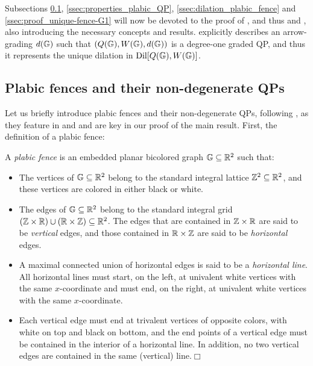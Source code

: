 \noindent Subsections \ref{ssec:QP_plabicfence}, \ref{ssec:properties_plabic_QP}, \ref{ssec:dilation_plabic_fence} and \ref{ssec:proof_unique-fence-G1} will now be devoted to the proof of , and thus  and , also introducing the necessary concepts and results.  explicitly describes an arrow-grading $d(\mathbb G)$ such that $(Q(\mathbb G),W(\mathbb G),d(\mathbb G))$ is a degree-one graded QP, and thus it represents the unique dilation in $\operatorname{Dil}[Q(\mathbb G),W(\mathbb G)]$.

\subsection{Plabic fences and their non-degenerate QPs}\label{ssec:QP_plabicfence} Let us briefly introduce plabic fences and their non-degenerate QPs, following \cite[Section 3]{CasalsGao}, as they feature in  and  and are key in our proof of the main result. First, the definition of a plabic fence:

\begin{definition}\label{def:plabic_fence}
A \emph{plabic fence} is an embedded planar bicolored graph $\mathbb G\subseteq\mathbb R^2$ such that:
\begin{itemize}\setlength\itemsep{0.5em}
    \item[(i)] The vertices of $\mathbb G\subseteq\mathbb R^2$ belong to the standard integral lattice $\mathbb Z^2\subseteq\mathbb R^2$, and these vertices are colored in either black or white.
    \item[(ii)] The edges of $\mathbb G\subseteq\mathbb R^2$ belong to the standard integral grid $(\mathbb Z\times\mathbb R)\cup (\mathbb R\times\mathbb Z)\subseteq\mathbb R^2$. The edges that are contained in $\mathbb Z\times\mathbb R$ are said to be \emph{vertical} edges, and those contained in $\mathbb R\times\mathbb Z$ are said to be \emph{horizontal} edges. 
    \item[(iii)] A maximal connected union of horizontal edges is said to be a \emph{horizontal line}. All horizontal lines must start, on the left, at univalent white vertices with the same $x$-coordinate and must end, on the right, at univalent white vertices with the same $x$-coordinate.
    \item[(iv)] Each vertical edge must end at trivalent vertices of opposite colors, with white on top and black on bottom, and the end points of a vertical edge must be contained in the interior of a horizontal line. In addition, no two vertical edges are contained in the same (vertical) line.\hfill$\Box$
\end{itemize}
\end{definition}

